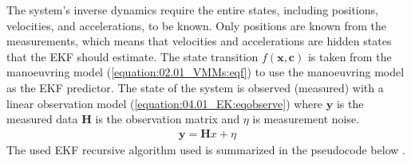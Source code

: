 \documentclass[review]{elsarticle}
\begin{document}
\sphinxAtStartPar
The system’s inverse dynamics require the entire states, including positions, velocities, and accelerations, to be known. Only positions are known from the measurements, which means that velocities and accelerations are hidden states that the EKF should estimate.
The state transition \(f(\mathbf{x},\mathbf{c})\) is taken from the manoeuvring model (\autoref{equation:02.01_VMMs:eqf}) to use the manoeuvring model as the EKF predictor.
The state of the system is observed (measured) with a linear observation model (\autoref{equation:04.01_EK:eqobserve}) where \(\mathbf{y}\) is the measured data \(\mathbf{H}\) is the observation matrix and \(\eta\) is measurement noise.
\begin{equation}\label{equation:04.01_EK:eqobserve}
\begin{split}\mathbf{y} = \mathbf{H} x + \eta\end{split}
\end{equation}
\sphinxAtStartPar
The used EKF recursive algorithm used is summarized in the pseudocode below \cite{brown_introduction_1997}.
\label{04.01_EK:ek-algorithm}
\end{document}

